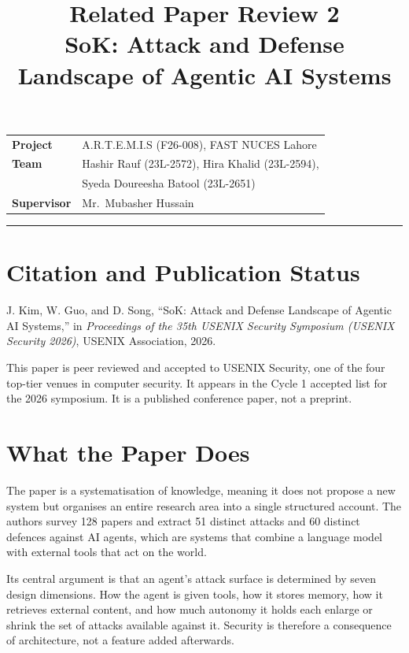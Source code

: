 \documentclass[11pt,a4paper]{article}
\title{\vspace{-2.5em}\textbf{Related Paper Review 2}\\[0.3em]
\large SoK: Attack and Defense Landscape of Agentic AI Systems}
\author{}
\date{}
\begin{document}
\maketitle
\vspace{-3em}

\begin{center}
\begin{tabular}{@{}ll@{}}
\textbf{Project} & A.R.T.E.M.I.S (F26-008), FAST NUCES Lahore \\
\textbf{Team} & Hashir Rauf (23L-2572), Hira Khalid (23L-2594), \\
 & Syeda Doureesha Batool (23L-2651) \\
\textbf{Supervisor} & Mr.\ Mubasher Hussain \\
\end{tabular}
\end{center}

\vspace{0.5em}
\hrule
\vspace{1em}

\section{Citation and Publication Status}

J. Kim, W. Guo, and D. Song, ``SoK: Attack and Defense Landscape of Agentic AI
Systems,'' in \textit{Proceedings of the 35th USENIX Security Symposium (USENIX
Security 2026)}, USENIX Association, 2026.

This paper is peer reviewed and accepted to USENIX Security, one of the four
top-tier venues in computer security. It appears in the Cycle 1 accepted list
for the 2026 symposium. It is a published conference paper, not a preprint.

\section{What the Paper Does}

The paper is a systematisation of knowledge, meaning it does not propose a new
system but organises an entire research area into a single structured account.
The authors survey 128 papers and extract 51 distinct attacks and 60 distinct
defences against AI agents, which are systems that combine a language model
with external tools that act on the world.

Its central argument is that an agent's attack surface is determined by seven
design dimensions. How the agent is given tools, how it stores memory, how it
retrieves external content, and how much autonomy it holds each enlarge or
shrink the set of attacks available against it. Security is therefore a
consequence of architecture, not a feature added afterwards.
\end{document}
